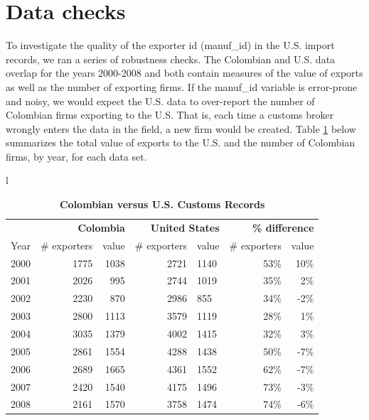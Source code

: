 \documentclass[12pt]{article}
\begin{document}
\pagebreak

\section{Data checks}

\label{sec:data_check}

To investigate the quality of the exporter id (manuf\_id) in the U.S. import
records, we ran a series of robustness checks. The Colombian and U.S. data
overlap for the years 2000-2008 and both contain measures of the value of
exports as well as the number of exporting firms. If the manuf\_id variable
is error-prone and noisy, we would expect the U.S. data to over-report the
number of Colombian firms exporting to the U.S. That is, each time a customs
broker wrongly enters the data in the field, a new firm would be created.
Table \ref{tab:ap_dat_comp} below summarizes the total value of exports to
the U.S. and the number of Colombian firms, by year, for each data set.

\begin{table}[tbp]
\centering
{\small 
\begin{tabular}{l}
\begin{tabular}{rrrrlrr}
\hline\hline
& \multicolumn{2}{r}{\textbf{Colombia}} & \multicolumn{2}{r}{\textbf{United
States}} & \multicolumn{2}{r}{\textbf{\% difference}} \\ \cline{2-7}
Year & \# exporters & value & \# exporters & value & \# exporters & value \\ 
\hline
2000 & 1775 & 1038 & 2721 & 1140 & 53\% & 10\% \\ 
2001 & 2026 & 995 & 2744 & 1019 & 35\% & 2\% \\ 
2002 & 2230 & 870 & 2986 & 855 & 34\% & -2\% \\ 
2003 & 2800 & 1113 & 3579 & 1119 & 28\% & 1\% \\ 
2004 & 3035 & 1379 & 4002 & 1415 & 32\% & 3\% \\ 
2005 & 2861 & 1554 & 4288 & 1438 & 50\% & -7\% \\ 
2006 & 2689 & 1665 & 4361 & 1552 & 62\% & -7\% \\ 
2007 & 2420 & 1540 & 4175 & 1496 & 73\% & -3\% \\ 
2008 & 2161 & 1570 & 3758 & 1474 & 74\% & -6\% \\ \hline
\end{tabular}%
\end{tabular}%
}
\caption{\textbf{Colombian versus U.S. Customs Records}}
\label{tab:ap_dat_comp}
\end{table}
\end{document}
